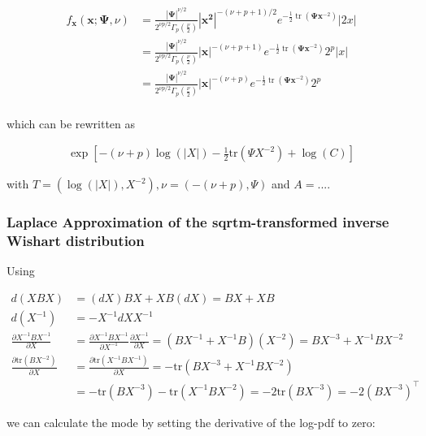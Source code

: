 \begin{align*}
	f_{\mathbf x}({\mathbf x}; {\mathbf \Psi}, \nu) &= \frac{\left|{\mathbf\Psi}\right|^{\nu/2}}{2^{\nu p/2}\Gamma_p(\frac \nu 2)} \left|\mathbf{x^2}\right|^{-(\nu+p+1)/2} e^{-\frac{1}{2}\operatorname{tr}(\mathbf\Psi\mathbf{x}^{-2})} |2x| \\
	&= \frac{\left|{\mathbf\Psi}\right|^{\nu/2}}{2^{\nu p/2}\Gamma_p(\frac \nu 2)} \left|\mathbf{x}\right|^{-(\nu+p+1)} e^{-\frac{1}{2}\operatorname{tr}(\mathbf\Psi\mathbf{x}^{-2})} 2^p|x| \\
	&= \frac{\left|{\mathbf\Psi}\right|^{\nu/2}}{2^{\nu p/2}\Gamma_p(\frac \nu 2)} \left|\mathbf{x}\right|^{-(\nu+p)} e^{-\frac{1}{2}\operatorname{tr}(\mathbf\Psi\mathbf{x}^{-2})} 2^p \\
	\label{eq:sqrtm_inverse_wishart_pdf}
\end{align*}

which can be rewritten as 

\begin{align*}
	\exp\left[-(\nu + p) \log(|X|) - \frac{1}{2}\text{tr}(\Psi X^{-2}) + \log(C)\right]
\end{align*}

with $T = (\log(|X|), X^{-2}), \nu = (-(\nu + p), \Psi)$ and $A = ...$. 

\subsubsection{Laplace Approximation of the sqrtm-transformed inverse Wishart distribution}

Using 

\begin{align*}
	d(XBX) &= (dX)BX + XB(dX) = BX + XB \\
	d(X^{-1}) &= -X^{-1} dX X^{-1} \\
	\frac{\partial X^{-1}BX^{-1}}{\partial X} &= \frac{\partial X^{-1}BX^{-1}}{\partial X^{-1}} \frac{\partial X^{-1}}{\partial X} = (BX^{-1} + X^{-1}B)(X^{-2}) = BX^{-3} + X^{-1}BX^{-2} \\
	\frac{\partial \text{tr}(BX^{-2})}{\partial X} &= 	\frac{\partial \text{tr}(X^{-1}BX^{-1})}{\partial X} = -\text{tr}(BX^{-3} + X^{-1}BX^{-2}) \\
	&= -\text{tr}(BX^{-3}) -\text{tr}(X^{-1}BX^{-2}) = -2\text{tr}(BX^{-3}) = -2(BX^{-3})^\top
\end{align*}

we can calculate the mode by setting the derivative of the log-pdf to zero:

